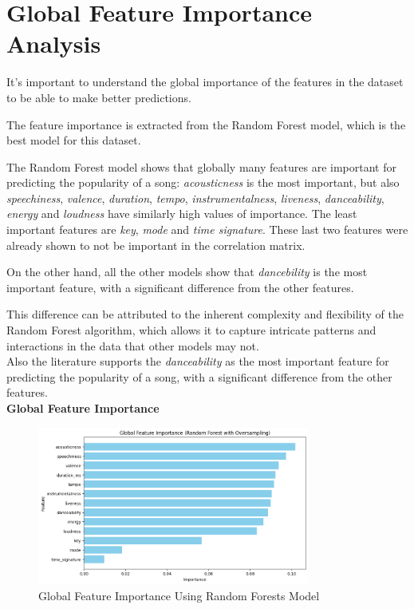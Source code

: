 \newpage

\section{Global Feature Importance Analysis}

It's important to understand the global importance of the features in the dataset to be able to make better predictions.

The feature importance is extracted from the Random Forest model, which is the best model for this dataset.

The Random Forest model shows that globally many features are important for predicting the popularity of a song: \textit{acousticness} is the most important, but also \textit{speechiness}, \textit{valence}, \textit{duration}, \textit{tempo}, \textit{instrumentalness}, \textit{liveness}, \textit{danceability}, \textit{energy} and \textit{loudness} have similarly high values of importance. The least important features are \textit{key}, \textit{mode} and \textit{time signature}. These last two features were already shown to not be important in the correlation matrix.

On the other hand, all the other models show that 
\textit{dancebility} is the most important feature, with a significant difference from the other features.

This difference can be attributed to the inherent complexity and flexibility of the Random Forest
algorithm, which allows it to capture intricate patterns and interactions in the data that other models may not.\\
Also the literature supports the \textit{danceability} as the most important feature for predicting the popularity of a song, with a significant difference from the other features.\\



\textbf{Global Feature Importance}

\begin{figure} [H]
    \centering
    \includegraphics[width=0.8\textwidth]{media/random_forest_feature_imp_global.png}
    \caption{Global Feature Importance Using Random Forests Model}
    \label{fig:feature_importance}
\end{figure}

